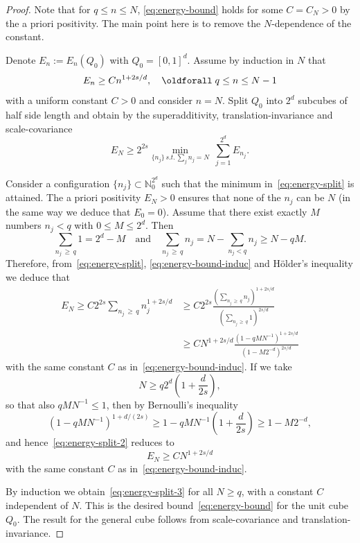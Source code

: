 \documentclass[10pt]{amsart}
\theoremstyle{definition}\newtheorem{defi}[theo]{Definition}\newtheorem{rema}[theo]{Remark}\newtheorem{exam}[theo]{Example}\newtheorem{exem}[theo]{Example}\newtheorem{nota}[theo]{Notation}
\newcommand\1{{\ensuremath {\mathds 1} }}
\renewcommand*{\forall}{\mathrel{\oldforall}}
\begin{document}
\begin{proof}
Note that for $q \le n \le N$, \eqref{eq:energy-bound} holds for some $C=C_N > 0$ by the a priori positivity. The main point here is to remove the $N$-dependence of the constant.

Denote $E_n := E_n(Q_0)$ with $Q_0=[0,1]^d$. Assume by induction in $N$ that
\begin{equation}\label{eq:energy-bound-induc}
E_n\ge C n^{1+2s/d}, \quad \forall q \le n \le N-1
\end{equation}
with a uniform constant $C>0$ and consider $n=N$. Split $Q_0$ into $2^d$ subcubes of half side length and obtain by the superadditivity, translation-invariance and scale-covariance
\begin{equation}\label{eq:energy-split}
E_{N} \ge 2^{2s} \min_{\{n_j\} \, s.t.\, \sum_j n_j = N} \ \sum_{j=1}^{2^d} E_{n_j}.
\end{equation}

Consider a configuration $\{n_j\}\subset \mathbb{N}_0^{2^d}$ such that the minimum in~\eqref{eq:energy-split} is attained. The a priori positivity $E_N>0$ ensures that none of the $n_j$ can be $N$ (in the same way we deduce that $E_0 = 0$). Assume that there exist exactly $M$ numbers $n_j < q$ with $0 \le M \le 2^d$. Then
\[
\sum_{n_j \,\ge\,q} 1 = 2^d - M
\quad \text{and} \quad
\sum_{n_j\,\ge\,q} n_j = N - \sum_{n_j<q} n_j \ge N - qM.
\]
Therefore, from~\eqref{eq:energy-split}, \eqref{eq:energy-bound-induc} and H\"older's inequality we deduce that
\begin{align}\label{eq:energy-split-2}
E_{N} \ge C 2^{2s} \sum_{n_j\,\ge\,q} n_j^{1+2s/d}
&\ge C 2^{2s} \frac{\left(\sum_{n_j\,\ge\,q} n_j \right)^{1+2s/d}}{\left(\sum_{n_j\,\ge\,q} 1\right)^{2s/d}}\\
&\geq C N^{1+2s/d} \frac{\left(1 - qM N^{-1}\right)^{1+2s/d}}{\left(1 -M 2^{-d}\right)^{2s/d}}
\end{align}
with the same constant $C$ as in~\eqref{eq:energy-bound-induc}. If we take
\[
N \ge q2^{d} \left(1+\frac{d}{2s}\right),
\]
so that also $qMN^{-1} \le 1$, then by Bernoulli's inequality
\[
\left(1-qMN^{-1}\right)^{1+d/(2s)} \ge 1- qMN^{-1} \left(1+ \frac{d}{2s}\right) \ge 1-M2^{-d},
\]
and hence~\eqref{eq:energy-split-2} reduces to
\begin{equation}\label{eq:energy-split-3}
E_{N} \ge CN^{1+2s/d}
\end{equation}
with the same constant $C$ as in~\eqref{eq:energy-bound-induc}.

By induction we obtain~\eqref{eq:energy-split-3} for all $N\ge q$, with a constant $C$ independent of $N$. This is the desired bound~\eqref{eq:energy-bound} for the unit cube $Q_0$. The result for the general cube follows from scale-covariance and translation-invariance.
\end{proof}
\end{document}
